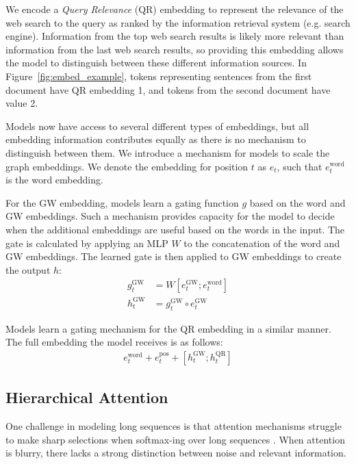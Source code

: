 \documentclass[11pt,a4paper]{article}
\begin{document}
We encode a \textit{Query Relevance} (QR) embedding to represent the relevance of the web search to the query as ranked by the information retrieval system (e.g. search engine). Information from the top web search results is likely more relevant than information from the last web search results, so providing this embedding allows the model to distinguish between these different information sources. In Figure~\ref{fig:embed_example}, tokens representing sentences from the first document have QR embedding 1, and tokens from the second document have value 2. 

Models now have access to several different types of embeddings, but all embedding information contributes equally as there is no mechanism to distinguish between them. We introduce a mechanism for models to scale the graph embeddings. We denote the embedding for position $t$ as  $e_t$, such that $e_t^{\textrm{word}}$ is the word embedding.

For the GW embedding, models learn a gating function $g$ based on the word and GW embeddings. Such a mechanism provides capacity for the model to decide when the additional embeddings are useful based on the words in the input. The gate is calculated by applying an MLP $W$ to the concatenation of the word and GW embeddings. The learned gate is then applied to GW embeddings to create the output $h$:
\begin{align}
g_t^{\textrm{GW}} &= W [e_t^{\textrm{GW}}; e_t^{\textrm{word}}]\nonumber\\
h_t^{\textrm{GW}} &= g_t^{\textrm{GW}}\circ e_t^{\textrm{GW}}\nonumber
\end{align}

Models learn a gating mechanism for the QR embedding in a similar manner. The full embedding the model receives is as follows:
\begin{align}
e_t^{\textrm{word}} + e_t^{\textrm{pos}} + [h_t^{\textrm{GW}}; h_t^{\textrm{QR}}] \nonumber
\end{align}

\subsection{Hierarchical Attention} One challenge in modeling long sequences is that attention mechanisms struggle to make sharp selections when softmax-ing over long sequences \cite{fan2018hierarchical}. When attention is blurry, there lacks a strong distinction between noise and relevant information.
\end{document}
